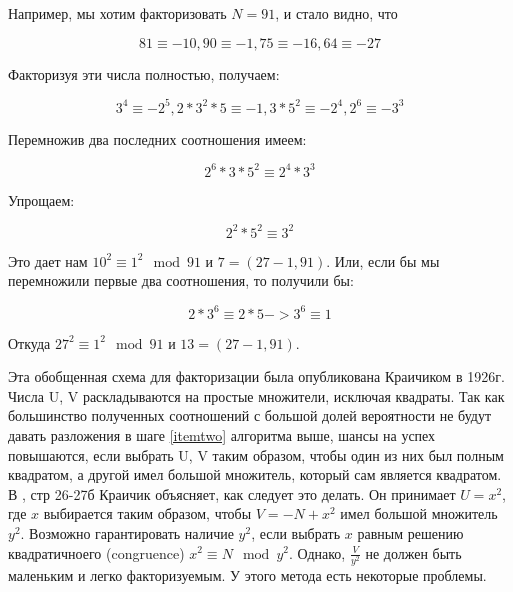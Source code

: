 \documentclass[russian, utf8, a4paper,12pt]{report}
\begin{document}
Например, мы хотим факторизовать $N = 91$, и стало видно, что 

\begin{equation*}
81 \equiv -10, 90 \equiv -1, 75 \equiv -16, 64 \equiv -27
\end{equation*}

Факторизуя эти числа полностью, получаем:

\begin{equation*}
3^4 \equiv {-2}^5, 2*3^2*5 \equiv -1, 3*5^2 \equiv {-2}^4, 2^6 \equiv {-3}^3
\end{equation*}


Перемножив два последних соотношения имеем:

\begin{equation*}
2^6*3*5^2 \equiv 2^4*3^3
\end{equation*}

Упрощаем:

\begin{equation*}
2^2*5^2 \equiv 3^2
\end{equation*}

Это дает нам $10^2 \equiv 1^2 \mod 91$ и $7 = (27-1, 91)$. Или, если бы мы перемножили первые два соотношения, то получили бы:

\begin{equation*}
2*3^6 \equiv 2*5 -> 3^6 \equiv 1
\end{equation*}


Откуда $27^2 \equiv 1^2 \mod 91$ и $13 = (27-1, 91)$.

Эта обобщенная схема для факторизации была опубликована Краичиком \cite{krai} в 1926г. Числа U, V раскладываются на простые множители, исключая квадраты. Так как большинство полученных соотношений с большой долей вероятности не будут давать разложения в шаге \ref{itemtwo} алгоритма выше, шансы на успех повышаются, если выбрать U, V таким образом, чтобы один из них был полным квадратом, а другой имел большой множитель, который сам является квадратом. В \cite{krai}, стр 26-27б Краичик объясняет, как следует это делать. Он принимает $U = x^2$, где $x$ выбирается таким образом, чтобы $V = -N+x^2$ имел большой множитель $y^2$. Возможно гарантировать наличие $y^2$, если выбрать $x$ равным решению квадратичноего (congruence) $x^2 \equiv N \mod y^2$. Однако, $\frac{V}{y^2}$ не должен быть маленьким и легко факторизуемым. У этого метода есть некоторые проблемы.
\end{document}
